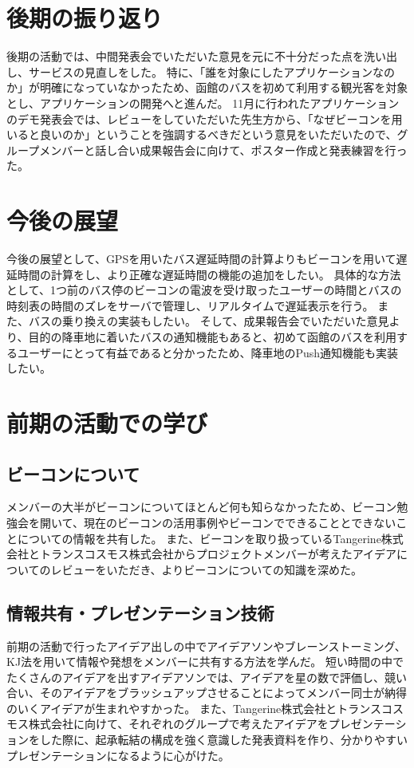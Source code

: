 \documentclass[openany,11pt,papersize]{jsbook}
\begin{document}

\section{後期の振り返り}
後期の活動では、中間発表会でいただいた意見を元に不十分だった点を洗い出し、サービスの見直しをした。
特に、「誰を対象にしたアプリケーションなのか」が明確になっていなかったため、函館のバスを初めて利用する観光客を対象とし、アプリケーションの開発へと進んだ。
11月に行われたアプリケーションのデモ発表会では、レビューをしていただいた先生方から、「なぜビーコンを用いると良いのか」ということを強調するべきだという意見をいただいたので、グループメンバーと話し合い成果報告会に向けて、ポスター作成と発表練習を行った。


\section{今後の展望}
今後の展望として、GPSを用いたバス遅延時間の計算よりもビーコンを用いて遅延時間の計算をし、より正確な遅延時間の機能の追加をしたい。
具体的な方法として、1つ前のバス停のビーコンの電波を受け取ったユーザーの時間とバスの時刻表の時間のズレをサーバで管理し、リアルタイムで遅延表示を行う。
また、バスの乗り換えの実装もしたい。
そして、成果報告会でいただいた意見より、目的の降車地に着いたバスの通知機能もあると、初めて函館のバスを利用するユーザーにとって有益であると分かったため、降車地のPush通知機能も実装したい。



\section{前期の活動での学び}
\subsection{ビーコンについて}
メンバーの大半がビーコンについてほとんど何も知らなかったため、ビーコン勉強会を開いて、現在のビーコンの活用事例やビーコンでできることとできないことについての情報を共有した。
また、ビーコンを取り扱っているTangerine株式会社とトランスコスモス株式会社からプロジェクトメンバーが考えたアイデアについてのレビューをいただき、よりビーコンについての知識を深めた。


\subsection{情報共有・プレゼンテーション技術}
前期の活動で行ったアイデア出しの中でアイデアソンやブレーンストーミング、KJ法を用いて情報や発想をメンバーに共有する方法を学んだ。
短い時間の中でたくさんのアイデアを出すアイデアソンでは、アイデアを星の数で評価し、競い合い、そのアイデアをブラッシュアップさせることによってメンバー同士が納得のいくアイデアが生まれやすかった。
また、Tangerine株式会社とトランスコスモス株式会社に向けて、それぞれのグループで考えたアイデアをプレゼンテーションをした際に、起承転結の構成を強く意識した発表資料を作り、分かりやすいプレゼンテーションになるように心がけた。
\end{document}
